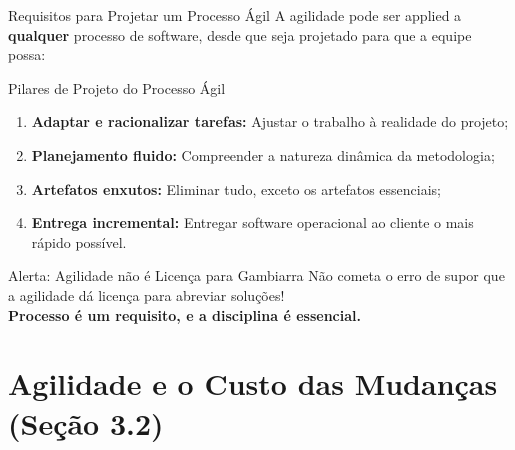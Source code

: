 \documentclass[aspectratio=169, 9pt]{beamer}
\begin{document}
\begin{frame}{Requisitos para Projetar um Processo Ágil}
  A agilidade pode ser applied a \textbf{qualquer} processo de software, desde que seja projetado para que a equipe possa:

  \vspace{0.2cm}
  \begin{block}{Pilares de Projeto do Processo Ágil}
    \begin{enumerate}
      \item \textbf{Adaptar e racionalizar tarefas:} Ajustar o trabalho à realidade do projeto;
      \item \textbf{Planejamento fluido:} Compreender a natureza dinâmica da metodologia;
      \item \textbf{Artefatos enxutos:} Eliminar tudo, exceto os artefatos essenciais;
      \item \textbf{Entrega incremental:} Entregar software operacional ao cliente o mais rápido possível.
    \end{enumerate}
  \end{block}

  \vspace{0.2cm}
  \begin{alertblock}{Alerta: Agilidade não é Licença para Gambiarra}
    Não cometa o erro de supor que a agilidade dá licença para abreviar soluções! \\
    \textbf{Processo é um requisito, e a disciplina é essencial.}
  \end{alertblock}
\end{frame}


\section{Agilidade e o Custo das Mudanças (Seção 3.2)}
\end{document}
